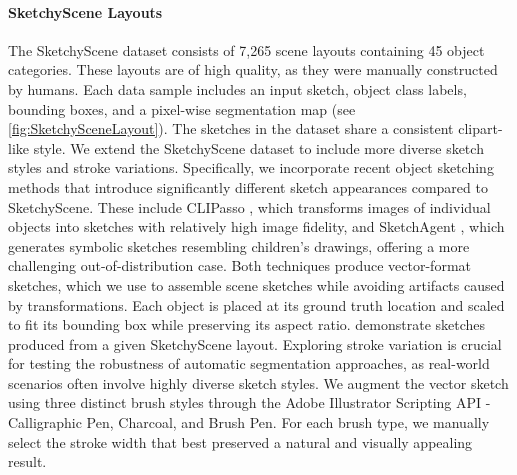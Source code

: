 \paragraph{SketchyScene Layouts}
The SketchyScene dataset \cite{Zou18SketchyScene} consists of 7,265 scene layouts containing 45 object categories. These layouts are of high quality, as they were manually constructed by humans. Each data sample includes an input sketch, object class labels, bounding boxes, and a pixel-wise segmentation map (see \cref{fig:SketchySceneLayout}).
The sketches in the dataset share a consistent clipart-like style. We extend the SketchyScene dataset to include more diverse sketch styles and stroke variations. Specifically, we incorporate recent object sketching methods that introduce significantly different sketch appearances compared to SketchyScene. These include CLIPasso \cite{vinker2022clipasso}, which transforms images of individual objects into sketches with relatively high image fidelity, and SketchAgent \cite{vinker2024sketchagent}, which generates symbolic sketches resembling children’s drawings, offering a more challenging out-of-distribution case.
Both techniques produce vector-format sketches, which we use to assemble scene sketches while avoiding artifacts caused by transformations. Each object is placed at its ground truth location and scaled to fit its bounding box while preserving its aspect ratio.  demonstrate sketches produced from a given SketchyScene layout. 
Exploring stroke variation is crucial for testing the robustness of automatic segmentation approaches, as real-world scenarios often involve highly diverse sketch styles. 
We augment the vector sketch using three distinct brush styles through the Adobe Illustrator Scripting API - Calligraphic Pen, Charcoal, and Brush Pen. For each brush type, we manually select the stroke width that best preserved a natural and visually appealing result.





